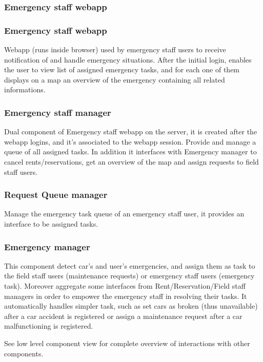 \documentclass[english]{article}
\begin{document}
	
\subsubsection*{Emergency staff webapp}

	\subsubsection{Emergency staff webapp}
	Webapp (runs inside browser) used by emergency staff users to receive notification of and handle emergency situations. After the initial login, enables the user to view list of assigned emergency tasks, and for each one of them displays on a map an overview of the emergency containing all related informations.
	\subsubsection{Emergency staff manager}
	Dual component of Emergency staff webapp on the server, it is created after the webapp logins, and it's associated to the webapp session. Provide and manage a queue of all assigned tasks. In addition it interfaces with Emergency manager to cancel rents/reservations, get an overview of the map and assign requests to field staff users.
		\subsubsection{Request Queue manager}
		Manage the emergency task queue of an emergency staff user, it provides an interface to be assigned tasks.
	\subsubsection{Emergency manager}
	This component detect car's and user's emergencies, and assign them as task to the field staff users (maintenance requests) or  emergency staff users (emergency task). Moreover aggregate some interfaces from Rent/Reservation/Field staff managers in order to empower the emergency staff in resolving their tasks. It automatically handles simpler task, such as set cars as broken (thus unavailable) after a car accident is registered or assign a maintenance request after a car malfunctioning is registered. \par See low level component view for complete overview of interactions with other components.
\end{document}
